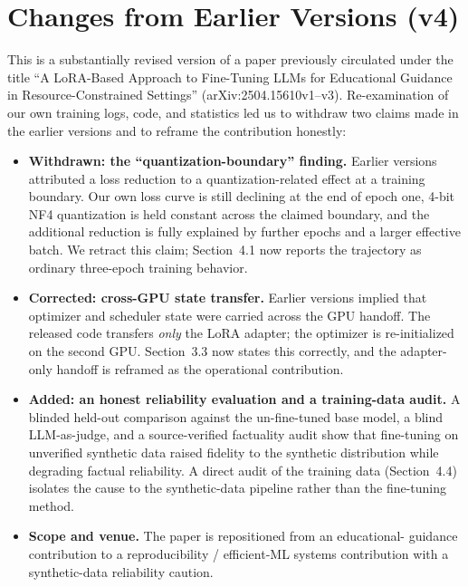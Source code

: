 \documentclass[11pt, a4paper]{article}
\begin{document}
\section*{Changes from Earlier Versions (v4)}
\small
This is a substantially revised version of a paper previously circulated under the
title ``A LoRA-Based Approach to Fine-Tuning LLMs for Educational Guidance in
Resource-Constrained Settings'' (arXiv:2504.15610v1--v3). Re-examination of our own
training logs, code, and statistics led us to withdraw two claims made in the
earlier versions and to reframe the contribution honestly:

\begin{itemize}
  \item \textbf{Withdrawn: the ``quantization-boundary'' finding.} Earlier versions
  attributed a loss reduction to a quantization-related effect at a training
  boundary. Our own loss curve is still declining at the end of epoch one, 4-bit
  NF4 quantization is held constant across the claimed boundary, and the additional
  reduction is fully explained by further epochs and a larger effective batch. We
  retract this claim; Section~4.1 now reports the trajectory as ordinary
  three-epoch training behavior.
  \item \textbf{Corrected: cross-GPU state transfer.} Earlier versions implied that
  optimizer and scheduler state were carried across the GPU handoff. The released
  code transfers \emph{only} the LoRA adapter; the optimizer is re-initialized on
  the second GPU. Section~3.3 now states this correctly, and the adapter-only
  handoff is reframed as the operational contribution.
  \item \textbf{Added: an honest reliability evaluation and a training-data audit.}
  A blinded held-out comparison against the un-fine-tuned base model, a blind
  LLM-as-judge, and a source-verified factuality audit show that fine-tuning on
  unverified synthetic data raised fidelity to the synthetic distribution while
  degrading factual reliability. A direct audit of the training data
  (Section~4.4) isolates the cause to the synthetic-data pipeline rather than the
  fine-tuning method.
  \item \textbf{Scope and venue.} The paper is repositioned from an educational-
  guidance contribution to a reproducibility / efficient-ML systems contribution
  with a synthetic-data reliability caution.
\end{itemize}
\normalsize
\end{document}
